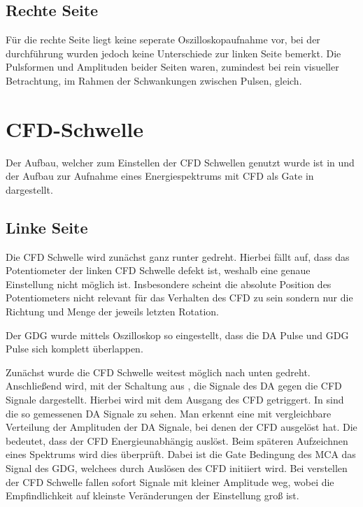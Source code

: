 \subsection*{Rechte Seite}
Für die rechte Seite liegt keine seperate Oszilloskopaufnahme vor, bei der durchführung wurden jedoch keine Unterschiede zur linken Seite bemerkt. Die Pulsformen und Amplituden beider Seiten waren, zumindest bei rein visueller Betrachtung, im Rahmen der Schwankungen zwischen Pulsen, gleich.


\def\startLine{$\SI{356.0}{\kilo\eV}$}
\def\380kev{$\SI{383.8}{\kilo\eV}$}
\def\81kev{$\SI{81.0}{\kilo\eV}$}

\section{CFD-Schwelle}
Der Aufbau, welcher zum Einstellen der CFD Schwellen genutzt wurde ist in  und der Aufbau zur Aufnahme eines Energiespektrums mit CFD als Gate in  dargestellt.

\subsection*{Linke Seite}
Die CFD Schwelle wird zunächst ganz runter gedreht. Hierbei fällt auf, dass das Potentiometer der linken CFD Schwelle defekt ist, weshalb eine genaue Einstellung nicht möglich ist. Insbesondere scheint die absolute Position des Potentiometers nicht relevant für das Verhalten des CFD zu sein sondern nur die Richtung und Menge der jeweils letzten Rotation.

Der GDG wurde mittels Oszilloskop so eingestellt, dass die DA Pulse und GDG Pulse sich komplett überlappen.

Zunächst wurde die CFD Schwelle weitest möglich nach unten gedreht. Anschließend wird, mit der Schaltung aus , die Signale des DA gegen die CFD Signale dargestellt. Hierbei wird mit dem Ausgang des CFD getriggert. In  sind die so gemessenen DA Signale zu sehen. Man erkennt eine mit  vergleichbare Verteilung der Amplituden der DA Signale, bei denen der CFD ausgelöst hat. Die bedeutet, dass der CFD Energieunabhängig auslöst. Beim späteren Aufzeichnen eines Spektrums wird dies überprüft. Dabei ist die Gate Bedingung des MCA das Signal des GDG, welchees durch Auslösen des CFD initiiert wird.
Bei verstellen der CFD Schwelle fallen sofort Signale mit kleiner Amplitude weg, wobei die Empfindlichkeit auf kleinste Veränderungen der Einstellung groß ist.

